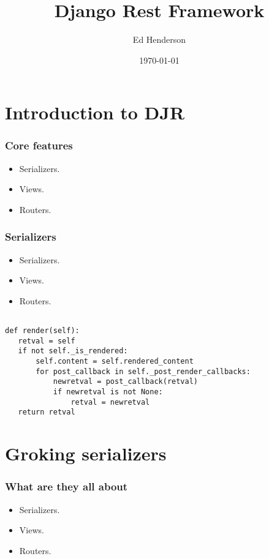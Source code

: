 \documentclass{beamer}
\title{Django Rest Framework}
\author{Ed Henderson}
\date{\today}
\begin{document}

\frame{\titlepage}

\section[Outline]{}
\frame{\tableofcontents}

\section{Introduction to DJR}
\begin{frame}

  \frametitle{Core features}

  \begin{itemize}
  \item<1-> Serializers.
  \item<2-> Views.
  \item<3-> Routers.
  \end{itemize}
\end{frame}

\begin{frame}[fragile]

  \frametitle{Serializers}

  \begin{itemize}
  \item Serializers.
  \item Views.
  \item Routers.
  \end{itemize}
  
    \begin{lstlisting}
        
def render(self):
   retval = self
   if not self._is_rendered:
       self.content = self.rendered_content
       for post_callback in self._post_render_callbacks:
           newretval = post_callback(retval)
           if newretval is not None:
               retval = newretval
   return retval
    \end{lstlisting}
  
\end{frame}

\section{Groking serializers}
\begin{frame}

  \frametitle{What are they all about}

  \begin{itemize}
  \item<1-> Serializers.
  \item<2-> Views.
  \item<3-> Routers.
  \end{itemize}
\end{frame}
\end{document}
